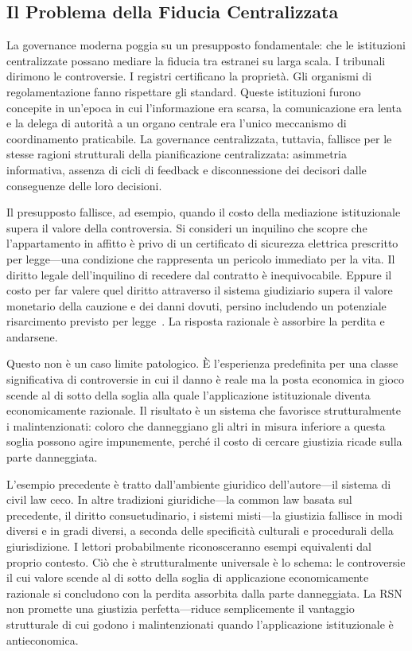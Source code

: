 \documentclass[11pt,a4paper,twocolumn]{article}
\begin{document}
\subsection{Il Problema della Fiducia Centralizzata}

La governance moderna poggia su un presupposto fondamentale: che le istituzioni centralizzate possano mediare la fiducia tra estranei su larga scala. I tribunali dirimono le controversie. I registri certificano la proprietà. Gli organismi di regolamentazione fanno rispettare gli standard. Queste istituzioni furono concepite in un'epoca in cui l'informazione era scarsa, la comunicazione era lenta e la delega di autorità a un organo centrale era l'unico meccanismo di coordinamento praticabile. La governance centralizzata, tuttavia, fallisce per le stesse ragioni strutturali della pianificazione centralizzata: asimmetria informativa, assenza di cicli di feedback e disconnessione dei decisori dalle conseguenze delle loro decisioni.

Il presupposto fallisce, ad esempio, quando il costo della mediazione istituzionale supera il valore della controversia. Si consideri un inquilino che scopre che l'appartamento in affitto è privo di un certificato di sicurezza elettrica prescritto per legge---una condizione che rappresenta un pericolo immediato per la vita. Il diritto legale dell'inquilino di recedere dal contratto è inequivocabile. Eppure il costo per far valere quel diritto attraverso il sistema giudiziario supera il valore monetario della cauzione e dei danni dovuti, persino includendo un potenziale risarcimento previsto per legge~\cite{czcourtfees}. La risposta razionale è assorbire la perdita e andarsene.

Questo non è un caso limite patologico. È l'esperienza predefinita per una classe significativa di controversie in cui il danno è reale ma la posta economica in gioco scende al di sotto della soglia alla quale l'applicazione istituzionale diventa economicamente razionale. Il risultato è un sistema che favorisce strutturalmente i malintenzionati: coloro che danneggiano gli altri in misura inferiore a questa soglia possono agire impunemente, perché il costo di cercare giustizia ricade sulla parte danneggiata.

L'esempio precedente è tratto dall'ambiente giuridico dell'autore---il sistema di civil law ceco. In altre tradizioni giuridiche---la common law basata sul precedente, il diritto consuetudinario, i sistemi misti---la giustizia fallisce in modi diversi e in gradi diversi, a seconda delle specificità culturali e procedurali della giurisdizione. I lettori probabilmente riconosceranno esempi equivalenti dal proprio contesto. Ciò che è strutturalmente universale è lo schema: le controversie il cui valore scende al di sotto della soglia di applicazione economicamente razionale si concludono con la perdita assorbita dalla parte danneggiata. La RSN non promette una giustizia perfetta---riduce semplicemente il vantaggio strutturale di cui godono i malintenzionati quando l'applicazione istituzionale è antieconomica.
\end{document}
